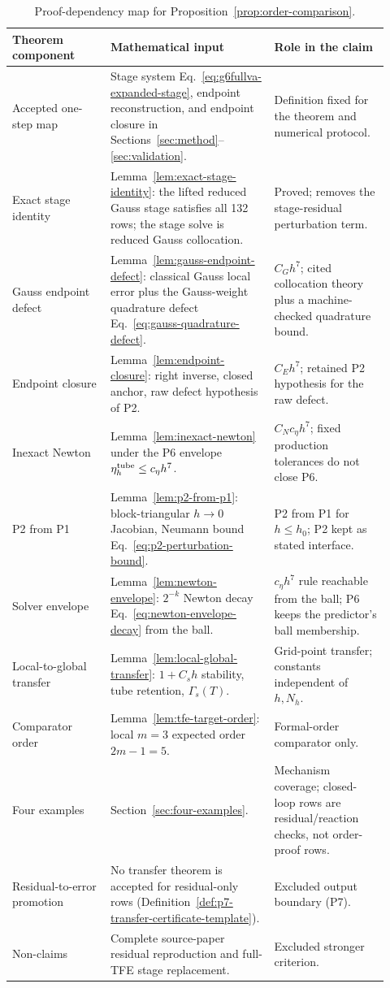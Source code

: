 \documentclass[preprint,12pt]{elsarticle}
\newcommand{\tfe}{TFE}
\begin{document}
\begin{table}[htbp]
\centering
\caption{Proof-dependency map for Proposition~\ref{prop:order-comparison}.}
\label{tab:proof-traceability}
\footnotesize
\setlength{\tabcolsep}{3pt}
\renewcommand{\arraystretch}{0.85}
\begin{tabular}{P{0.24\linewidth}P{0.40\linewidth}P{0.28\linewidth}}
\toprule
Theorem component & Mathematical input & Role in the claim \\
\midrule
Accepted one-step map &
Stage system Eq.~\eqref{eq:g6fullva-expanded-stage}, endpoint
reconstruction, and endpoint closure in Sections~\ref{sec:method}--\ref{sec:validation}. &
Definition fixed for the theorem and numerical protocol. \\
Exact stage identity &
Lemma~\ref{lem:exact-stage-identity}: the lifted reduced Gauss stage
satisfies all 132 rows; the stage solve is reduced Gauss collocation. &
Proved; removes the stage-residual perturbation term. \\
Gauss endpoint defect &
Lemma~\ref{lem:gauss-endpoint-defect}: classical Gauss local error plus the
Gauss-weight quadrature defect Eq.~\eqref{eq:gauss-quadrature-defect}. &
\(C_Gh^7\); cited collocation theory plus a machine-checked quadrature bound. \\
Endpoint closure &
Lemma~\ref{lem:endpoint-closure}: right inverse, closed anchor, raw defect
hypothesis of P2. &
\(C_Eh^7\); retained P2 hypothesis for the raw defect. \\
Inexact Newton &
Lemma~\ref{lem:inexact-newton} under the P6 envelope
\(\eta_h^{\rm tube}\le c_\eta h^7\). &
\(C_Nc_\eta h^7\); fixed production tolerances do not close P6. \\
P2 from P1 &
Lemma~\ref{lem:p2-from-p1}: block-triangular $h\to0$ Jacobian, Neumann
bound Eq.~\eqref{eq:p2-perturbation-bound}. &
P2 from P1 for $h\le h_0$; P2 kept as stated interface. \\
Solver envelope &
Lemma~\ref{lem:newton-envelope}: $2^{-k}$ Newton decay
Eq.~\eqref{eq:newton-envelope-decay} from the ball. &
$c_\eta h^7$ rule reachable from the ball; P6 keeps the predictor's ball
membership. \\
Local-to-global transfer &
Lemma~\ref{lem:local-global-transfer}: \(1+C_sh\) stability, tube retention,
\(\Gamma_s(T)\). &
Grid-point transfer; constants independent of \(h,N_h\). \\
Comparator order &
Lemma~\ref{lem:tfe-target-order}: local \(m=3\) expected order \(2m-1=5\). &
Formal-order comparator only. \\
Four examples &
Section~\ref{sec:four-examples}. &
Mechanism coverage; closed-loop rows are residual/reaction checks, not
order-proof rows. \\
Residual-to-error promotion &
No transfer theorem is accepted for residual-only rows
(Definition~\ref{def:p7-transfer-certificate-template}). &
Excluded output boundary (P7). \\
Non-claims &
Complete source-paper residual reproduction and full-\tfe{} stage
replacement. &
Excluded stronger criterion. \\
\bottomrule
\end{tabular}
\end{table}
\end{document}
